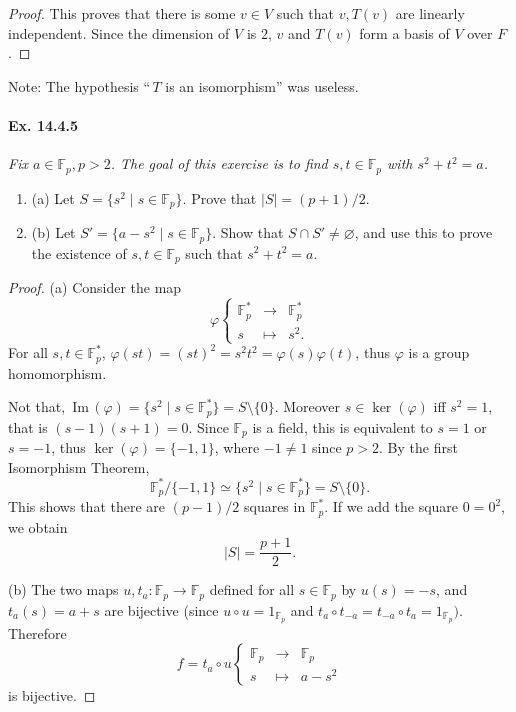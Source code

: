 \documentclass[11pt,a4paper]{article}
\newcommand{\be} {\begin{enumerate}}
\newcommand{\ee} {\end{enumerate}}
\newcommand{\F}{\mathbb{F}}
\newcommand{\im}{\,\mathrm{Im}\,}
\begin{document}
{\begin{proof}
This proves that there is some $v \in V$ such that $v,T(v)$ are linearly independent. Since the dimension of $V$ is $2$, $v$ and $T(v)$ form a basis of $V$ over $F$.
\end{proof}

Note: The hypothesis ``$\,T$ is an isomorphism'' was useless.

\paragraph{Ex. 14.4.5}{\it Fix $a \in \F_p, p>2$. The goal of this exercise is to find $s,t \in \F_p$ with $s^2+t^2 =a$.
\be
\item[(a)] Let $S = \{s^2 \mid s \in \F_p\}$. Prove that $|S| = (p+1)/2$.
\item[(b)] Let $S' = \{a-s^2 \mid s \in \F_p\}$. Show that $S \cap S' \ne \varnothing$, and use this to prove the existence of $s,t \in \F_p$ such that $s^2+t^2 = a$.
\ee
}
\begin{proof}

\item[(a)]  Consider the map
$$
\varphi
\left\{
\begin{array}{ccc}
\F_p^* & \to &\F_p^*\\
s & \mapsto & s^2.
\end{array}
\right.
$$
For all $s,t \in \F_p^*$, $\varphi(st) = (st)^2 = s^2t^2 = \varphi(s) \varphi(t)$, thus $\varphi$ is a group homomorphism.

Not that, $\im(\varphi) =\{s^2 \mid s \in \F_p^*\} = S \setminus \{0\}$. Moreover $s \in \ker(\varphi)$ iff $s^2 = 1$, that is $(s-1)(s+1) = 0$. Since $\F_p$ is a field, this is equivalent to $s = 1$ or $s=-1$, thus $\ker(\varphi) = \{-1,1\}$, where $-1 \ne 1$ since $p>2$.
By the first Isomorphism Theorem,
$$\F_p^*/\{-1,1\} \simeq \{s^2 \mid s \in \F_p^*\} = S \setminus\{0\}.$$
This shows that there are $(p-1)/2$ squares in $\F_p^*$. If we add the square $0 = 0^2$, we obtain
$$|S| = \frac{p+1}{2}.$$

\item[(b)] The two maps $u, t_a : \F_p \to \F_p$ defined for all $s \in \F_p$ by $u(s) = -s$, and $t_a(s)= a+s$ are bijective (since $u \circ u = 1_{\F_p}$ and $t_a \circ t_{-a} = t_{-a} \circ t_a = 1_{\F_p})$. Therefore
$$
f = t_a \circ u
\left\{
\begin{array}{ccc}
\F_p & \to & \F_p\\
s & \mapsto & a-s^2
\end{array}
\right.
$$
is bijective.


\end{proof}}
\end{document}
